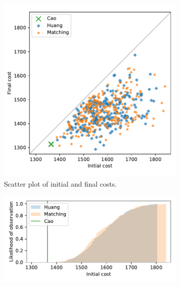 \documentclass[smallextended]{svjour3}
\begin{document}
\begin{figure}
    \begin{subfigure}{.5\textwidth}
        \includegraphics[width=\linewidth]{Fig8a.pdf}
        \caption{Scatter plot of initial and final costs.}
    \end{subfigure}
    \hfill%
    \begin{subfigure}{.5\textwidth}
        \includegraphics[width=\linewidth]{Fig8b1.pdf}


\end{subfigure}
\end{figure}
\end{document}

